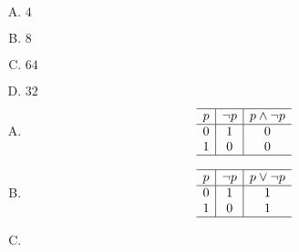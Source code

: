 {{        %
        \begin{practices}
            \begin{enumerate}[A.]
                \item $4$
                \item $8$
                \item $64$
                \item $32$
            \end{enumerate}
        \end{practices}
        
        \begin{practices}
            \begin{enumerate}[A.]
                \item 
                {
                    \begin{table}[H]
                        \[
                            \begin{array}{c|c|c}
                                \hline
                                p & \neg p & p \wedge \neg p \\
                                \hline
                                0 & 1 & 0 \\
                                1 & 0 & 0 \\
                                \hline
                            \end{array}
                        \]
                    \end{table}
                }
                \item
                {
                    \begin{table}[H]
                        \[
                            \begin{array}{c|c|c}
                                \hline
                                p & \neg p & p \vee \neg p \\
                                \hline
                                0 & 1 & 1 \\
                                1 & 0 & 1 \\
                                \hline
                            \end{array}
                        \]
                    \end{table}
                }
                \item
                {
                    \begin{table}[H]

\end{table}}
\end{enumerate}
\end{practices}}}
